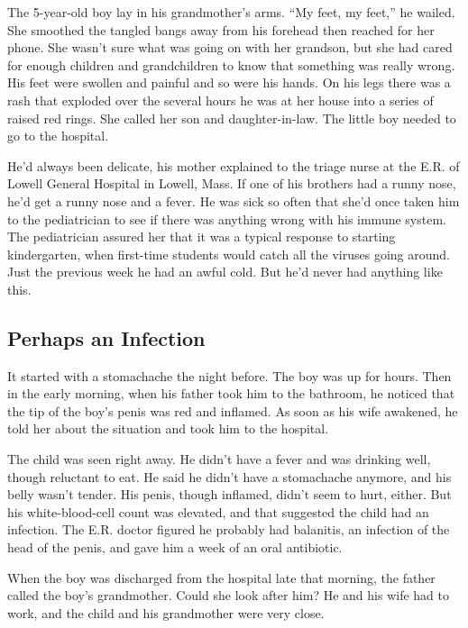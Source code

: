 The 5-year-old boy lay in his grandmother's arms. ``My feet, my feet,''
he wailed. She smoothed the tangled bangs away from his forehead then
reached for her phone. She wasn't sure what was going on with her
grandson, but she had cared for enough children and grandchildren to
know that something was really wrong. His feet were swollen and painful
and so were his hands. On his legs there was a rash that exploded over
the several hours he was at her house into a series of raised red rings.
She called her son and daughter-in-law. The little boy needed to go to
the hospital.

He'd always been delicate, his mother explained to the triage nurse at
the E.R. of Lowell General Hospital in Lowell, Mass. If one of his
brothers had a runny nose, he'd get a runny nose and a fever. He was
sick so often that she'd once taken him to the pediatrician to see if
there was anything wrong with his immune system. The pediatrician
assured her that it was a typical response to starting kindergarten,
when first-time students would catch all the viruses going around. Just
the previous week he had an awful cold. But he'd never had anything like
this.

\hypertarget{perhaps-an-infection}{%
\subsection{\texorpdfstring{\textbf{Perhaps an
Infection}}{Perhaps an Infection}}\label{perhaps-an-infection}}

It started with a stomachache the night before. The boy was up for
hours. Then in the early morning, when his father took him to the
bathroom, he noticed that the tip of the boy's penis was red and
inflamed. As soon as his wife awakened, he told her about the situation
and took him to the hospital.

The child was seen right away. He didn't have a fever and was drinking
well, though reluctant to eat. He said he didn't have a stomachache
anymore, and his belly wasn't tender. His penis, though inflamed, didn't
seem to hurt, either. But his white-blood-cell count was elevated, and
that suggested the child had an infection. The E.R. doctor figured he
probably had balanitis, an infection of the head of the penis, and gave
him a week of an oral antibiotic.

When the boy was discharged from the hospital late that morning, the
father called the boy's grandmother. Could she look after him? He and
his wife had to work, and the child and his grandmother were very close.

